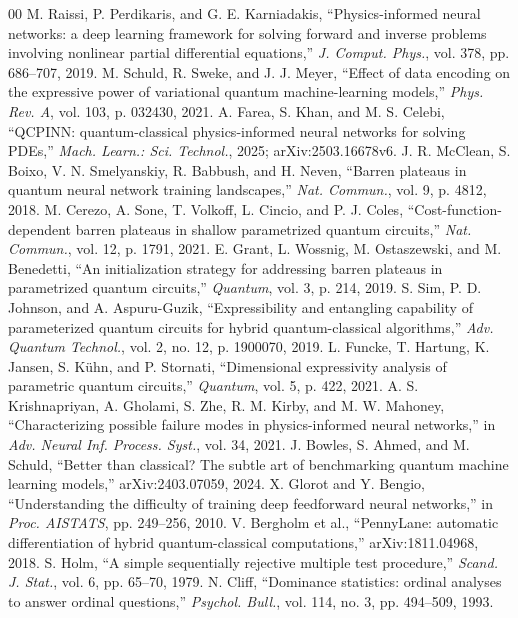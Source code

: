 \documentclass[conference,a4paper]{IEEEtran}
\begin{document}
\begin{thebibliography}{00}
 M. Raissi, P. Perdikaris, and G. E. Karniadakis, ``Physics-informed neural networks: a deep learning framework for solving forward and inverse problems involving nonlinear partial differential equations,'' \emph{J. Comput. Phys.}, vol. 378, pp. 686--707, 2019.
 M. Schuld, R. Sweke, and J. J. Meyer, ``Effect of data encoding on the expressive power of variational quantum machine-learning models,'' \emph{Phys. Rev. A}, vol. 103, p. 032430, 2021.
 A. Farea, S. Khan, and M. S. Celebi, ``QCPINN: quantum-classical physics-informed neural networks for solving PDEs,'' \emph{Mach. Learn.: Sci. Technol.}, 2025; arXiv:2503.16678v6.
 J. R. McClean, S. Boixo, V. N. Smelyanskiy, R. Babbush, and H. Neven, ``Barren plateaus in quantum neural network training landscapes,'' \emph{Nat. Commun.}, vol. 9, p. 4812, 2018.
 M. Cerezo, A. Sone, T. Volkoff, L. Cincio, and P. J. Coles, ``Cost-function-dependent barren plateaus in shallow parametrized quantum circuits,'' \emph{Nat. Commun.}, vol. 12, p. 1791, 2021.
 E. Grant, L. Wossnig, M. Ostaszewski, and M. Benedetti, ``An initialization strategy for addressing barren plateaus in parametrized quantum circuits,'' \emph{Quantum}, vol. 3, p. 214, 2019.
 S. Sim, P. D. Johnson, and A. Aspuru-Guzik, ``Expressibility and entangling capability of parameterized quantum circuits for hybrid quantum-classical algorithms,'' \emph{Adv. Quantum Technol.}, vol. 2, no. 12, p. 1900070, 2019.
 L. Funcke, T. Hartung, K. Jansen, S. K\"uhn, and P. Stornati, ``Dimensional expressivity analysis of parametric quantum circuits,'' \emph{Quantum}, vol. 5, p. 422, 2021.
 A. S. Krishnapriyan, A. Gholami, S. Zhe, R. M. Kirby, and M. W. Mahoney, ``Characterizing possible failure modes in physics-informed neural networks,'' in \emph{Adv. Neural Inf. Process. Syst.}, vol. 34, 2021.
 J. Bowles, S. Ahmed, and M. Schuld, ``Better than classical? The subtle art of benchmarking quantum machine learning models,'' arXiv:2403.07059, 2024.
 X. Glorot and Y. Bengio, ``Understanding the difficulty of training deep feedforward neural networks,'' in \emph{Proc. AISTATS}, pp. 249--256, 2010.
 V. Bergholm et al., ``PennyLane: automatic differentiation of hybrid quantum-classical computations,'' arXiv:1811.04968, 2018.
 S. Holm, ``A simple sequentially rejective multiple test procedure,'' \emph{Scand. J. Stat.}, vol. 6, pp. 65--70, 1979.
 N. Cliff, ``Dominance statistics: ordinal analyses to answer ordinal questions,'' \emph{Psychol. Bull.}, vol. 114, no. 3, pp. 494--509, 1993.
\end{thebibliography}
\end{document}
